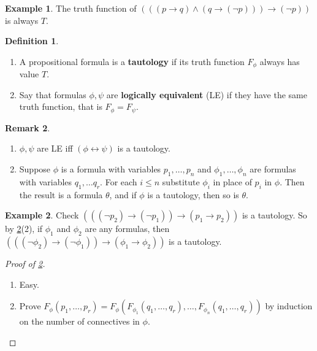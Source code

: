 \documentclass{article}
\newcommand{\rb}[1]{\left( #1 \right)}
\newcommand{\notb}[1]{\rb{\neg #1}}
\newcommand{\andb}[2]{\rb{#1 \land #2}}
\newcommand{\impb}[2]{\rb{#1 \rightarrow #2}}
\newcommand{\iffb}[2]{\rb{#1 \leftrightarrow #2}}
\theoremstyle{definition}\newtheorem{definition}{Definition}[subsection]
\theoremstyle{definition}\newtheorem{remark}[definition]{Remark}
\theoremstyle{definition}\newtheorem*{example}{Example}
\theoremstyle{definition}\newtheorem*{note}{Note}
\begin{document}

\begin{example}
The truth function of $ \impb{\andb{\impb{p}{q}}{\impb{q}{\notb{p}}}}{\notb{p}} $ is always $ T $.
\end{example}

\begin{definition}
\hfill
\begin{enumerate}
\item A propositional formula is a \textbf{tautology} if its truth function $ F_\phi $ always has value $ T $.
\item Say that formulas $ \phi, \psi $ are \textbf{logically equivalent} (LE) if they have the same truth function, that is $ F_\phi = F_\psi $.
\end{enumerate}
\end{definition}

\begin{remark}
\hfill
\label{rem:1.1.5}
\begin{enumerate}
\item $ \phi, \psi $ are LE iff $ \iffb{\phi}{\psi} $ is a tautology.
\item Suppose $ \phi $ is a formula with variables $ p_1, \dots, p_n $ and $ \phi_1, \dots, \phi_n $ are formulas with variables $ q_1, \dots q_r $. For each $ i \le n $ substitute $ \phi_i $ in place of $ p_i $ in $ \phi $. Then the result is a formula $ \theta $, and if $ \phi $ is a tautology, then so is $ \theta $.
\end{enumerate}
\end{remark}

\begin{example}
Check $ \impb{\impb{\notb{p_2}}{\notb{p_1}}}{\impb{p_1}{p_2}} $ is a tautology. So by \ref{rem:1.1.5}(2), if $ \phi_1 $ and $ \phi_2 $ are any formulas, then $ \impb{\impb{\notb{\phi_2}}{\notb{\phi_1}}}{\impb{\phi_1}{\phi_2}} $ is a tautology.
\end{example}

\begin{proof}[Proof of \ref{rem:1.1.5}]
\hfill
\begin{enumerate}
\item Easy.
\item Prove $ F_\phi\rb{p_1, \dots, p_r} = F_\phi\rb{F_{\phi_1}\rb{q_1, \dots, q_r}, \dots, F_{\phi_n}\rb{q_1, \dots, q_r}} $ by induction on the number of connectives in $ \phi $.
\end{enumerate}
\end{proof}
\end{document}
